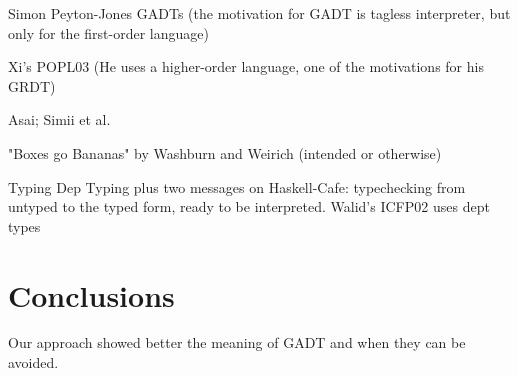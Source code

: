 \documentclass[preprint]{sigplanconf}
\begin{document}
Simon Peyton-Jones GADTs (the motivation for GADT is tagless
interpreter, but only for the first-order language)

Xi's POPL03 (He uses a higher-order language, one of the motivations
for his GRDT)

Asai; Simii et al.

"Boxes go Bananas" by Washburn and Weirich (intended or otherwise)


Typing Dep Typing plus two messages on Haskell-Cafe: typechecking 
from untyped to the typed form, ready to be interpreted. Walid's ICFP02
uses dept types


\section{Conclusions}

Our approach showed better the meaning of GADT and when they can be
avoided.
\end{document}
